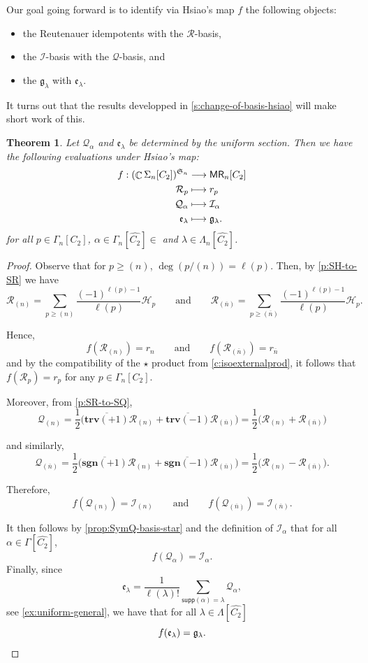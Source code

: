 \documentclass[11pt, oneside, reqno]{amsart}
\newtheorem{theorem}{Theorem}[section]
\theoremstyle{definition}
\numberwithin{equation}{section}
\DeclareMathOperator{\C}{\mathbb{C}}
\def \MR {{\sf{MR}}}
\def \frakg{{\mathfrak{g}}}
\def \kk{\C}
\def \ol{\overline}
\def \sym{\mathfrak{S}}
\def \ee{{\mathfrak{e}}}
\def \wh{\widehat}
\def \ztwo {{C_2}}
\def\qqand{\qquad\text{and}\qquad}
\def \supp{\mathsf{supp}}
\def \sgn{\mathbf{sgn}}
\def \trv{\mathbf{trv}}
\newcommand{\SB}[1]{\mathcal{#1}} 		%
\begin{document}
Our goal going forward is to identify via Hsiao's map $f$ the following objects:
\begin{itemize}
    \item the Reutenauer idempotents with the $\SB{R}$-basis,
    \item the $\SB{I}$-basis with the $\SB{Q}$-basis, and  
    \item the $\frakg_\lambda$ with $\ee_{\lambda}$.
\end{itemize}

It turns out that the results developped in \cref{s:change-of-basis-hsiao} will make short work of this. 

\begin{theorem}
Let $\SB{Q}_{\alpha}$ and $\ee_{\lambda}$ be determined by the uniform section. Then we have the following evaluations under Hsiao's map: 
\begin{align*}
f: (\kk\Sigma_n[\ztwo])^{\sym_n} &\longrightarrow \MR_n[\ztwo] \\
  \SB{R}_p &\longmapsto  r_p  \\ 
   \SB{Q}_{\alpha} &\longmapsto \SB{I}_{\alpha}\\
   \ee_{\lambda} &\longmapsto \frakg_{\lambda}.
\end{align*}
for all $p \in \Gamma_n[\ztwo] $, $\alpha \in \Gamma_n[\wh{\ztwo}] \in $ and $\lambda \in \Lambda_n[\wh{\ztwo}] $.
\end{theorem}
\begin{proof}
Observe that for $p \geq (n)$, $\deg(p/(n)) = \ell(p)$.
Then, by \cref{p:SH-to-SR} we have
\[
    \SB{R}_{(n)} = \sum_{p \geq (n)} \dfrac{(-1)^{\ell(p)-1}}{\ell(p)} \SB{H}_p
    \qqand
    \SB{R}_{(\ol{n})} = \sum_{p \geq (\ol{n})} \dfrac{(-1)^{\ell(p)-1}}{\ell(p)} \SB{H}_p.
\]

Hence,
\[
    f(\SB{R}_{(n)}) = r_n
    \qqand
    f(\SB{R}_{(\ol{n})}) = r_{\ol{n}}
\]
and by the compatibility of the $\star$ product from \cref{c:isoexternalprod}, it follows that $f(\SB{R}_p) = r_p$ for any $p \in \Gamma_n[\ztwo]$.

Moreover, from \cref{p:SR-to-SQ}, 
\[
    \SB{Q}_{(n)} =
    \dfrac{1}{2} \Big( \ol{{\trv}(+1)} \SB{R}_{(n)} + \ol{{\trv}(-1)} \SB{R}_{(\ol{n})} \Big) =
    \dfrac{1}{2} \Big( \SB{R}_{(n)} + \SB{R}_{(\ol{n})} \Big)
\]

and similarly,
\[
    \SB{Q}_{(\ol{n})} =
    \dfrac{1}{2} \Big( \ol{{\sgn}(+1)} \SB{R}_{(n)} + \ol{{\sgn}(-1)} \SB{R}_{(\ol{n})} \Big) =
    \dfrac{1}{2} \Big( \SB{R}_{(n)} - \SB{R}_{(\ol{n})} \Big).
\]

Therefore,
\[  
    f(\SB{Q}_{(n)}) = \SB{I}_{(n)}
    \qqand
    f(\SB{Q}_{(\ol{n})}) = \SB{I}_{(\ol{n})}.
\]

It then follows by \cref{prop:SymQ-basis-star} and the definition of $\SB{I}_\alpha$ that for all $\alpha \in \Gamma[\wh{\ztwo}]$,
\[
    f(\SB{Q}_\alpha) = \SB{I}_\alpha.
\]
Finally, since
\[
    \ee_\lambda = \dfrac{1}{\ell(\lambda)!} \sum_{\supp(\alpha) = \lambda} \SB{Q}_\alpha,
\]
see \cref{ex:uniform-general}, we have that for all $\lambda \in \Lambda[\wh{\ztwo}]$
\[
    f(\ee_\lambda) = \mathfrak{g}_\lambda. \qedhere
\]
\end{proof}
\end{document}

